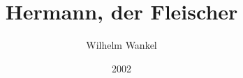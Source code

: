 \documentclass[a4paper,DIV=calc,11pt]{scrbook}
\begin{document}

										
										





\title{Hermann, der Fleischer}
\author{Wilhelm Wankel}
\date{2002}
\maketitle
\end{document}
